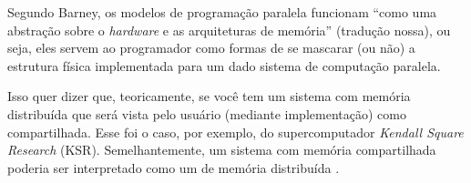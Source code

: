 		\label{subsec:par-comp-models}
		
		Segundo Barney, os modelos de programação paralela funcionam ``como
		uma abstração sobre o \textit{hardware} e as arquiteturas de memória''
		(tradução nossa), ou seja, eles servem ao programador como formas de
		se mascarar (ou não) a estrutura física implementada para um dado 
		sistema de computação paralela. 
		
		Isso quer dizer que, teoricamente, se você tem um sistema com memória
		distribuída que será vista pelo usuário (mediante implementação) como
		compartilhada. Esse foi o caso, por exemplo, do supercomputador
		\textit{Kendall Square Research} (KSR). Semelhantemente, um sistema 
		com memória compartilhada poderia ser interpretado como um de memória 
		distribuída \cite{LLNL:parcomp}.
		
